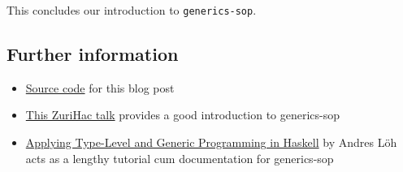 This concludes our introduction to \texttt{generics-sop}.

\hypertarget{further-information}{%
\subsection{Further information}\label{further-information}}

\begin{itemize}
\tightlist
\item
  \href{https://github.com/srid/generics-sop-examples/}{Source code} for
  this blog post
\item
  \href{https://www.youtube.com/watch?v=sQxH349HOik}{This ZuriHac talk}
  provides a good introduction to generics-sop
\item
  \href{https://github.com/kosmikus/SSGEP/blob/master/LectureNotes.pdf}{Applying
  Type-Level and Generic Programming in Haskell} by Andres Löh acts as a
  lengthy tutorial cum documentation for generics-sop
\end{itemize}

